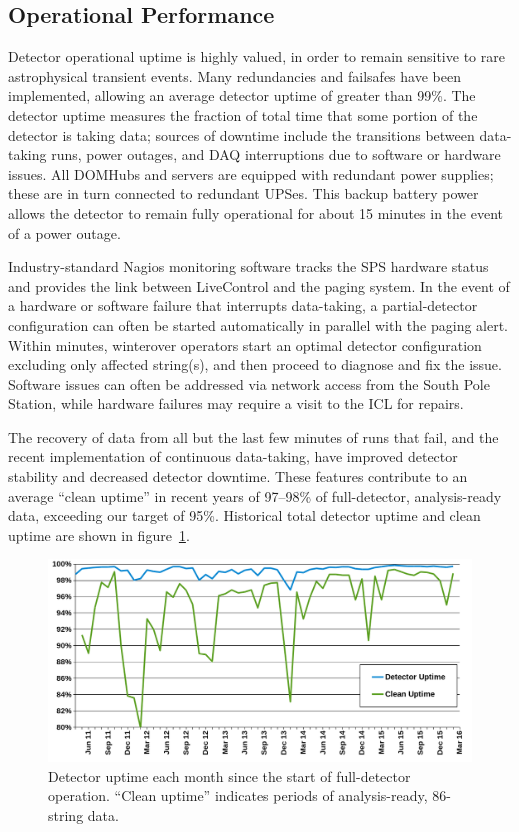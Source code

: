 \subsection{\label{sec:operational_performance}Operational Performance}

Detector operational uptime is highly valued, in order to remain
sensitive to rare astrophysical transient events.  Many redundancies and
failsafes have been implemented, allowing an average detector uptime of greater
than 99\%. The detector uptime measures the fraction of total time
that some portion of the detector is taking data; sources of downtime
include the transitions between data-taking runs, power outages, and
DAQ interruptions due to software or hardware issues. All DOMHubs and servers are equipped with redundant power
supplies; these are in turn connected to redundant UPSes. This backup battery
power allows the detector to remain fully operational for about 15 minutes in the
event of a power outage.

Industry-standard Nagios monitoring software tracks the SPS hardware status and provides the link
between LiveControl and the paging system.  In the event of a hardware
or software failure that interrupts data-taking, a partial-detector configuration can
often be started automatically in parallel with the paging alert.
Within minutes, winterover operators start an optimal detector configuration
excluding only affected string(s), and then proceed to diagnose and fix the
issue.  Software issues can often be addressed via network access from the
South Pole Station, while hardware failures may require a visit to the ICL
for repairs.

The recovery of data from all but the last few minutes of runs that fail,
and the recent implementation of continuous data-taking, have improved
detector stability and decreased detector downtime. These features
contribute to an average ``clean uptime'' in recent years of 97--98\% of
full-detector, analysis-ready data, exceeding our target of 95\%.
Historical total detector uptime and clean uptime are shown in
figure~\ref{fig:clean-uptime}.   

\begin{figure}[!ht]
 \centering
 \includegraphics[width=1.0\textwidth]{graphics/uptime/clean-uptime.png}
 \caption{Detector uptime each month since the start of full-detector
   operation. ``Clean uptime'' indicates periods of analysis-ready,
   86-string data.} 
 \label{fig:clean-uptime}
\end{figure}

